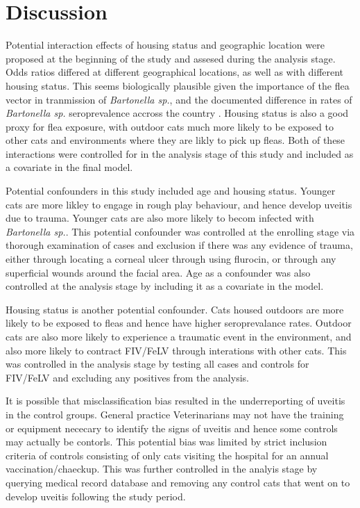 \documentclass[11pt,twocolumn]{article}
\begin{document}
\section{Discussion}
		Potential interaction effects of housing status and geographic location were proposed at the beginning of the study and assesed during the analysis stage.
		Odds ratios differed at different geographical locations, as well as with different housing status.
		This seems biologically plausible given the importance of the flea vector in tranmission of \emph{Bartonella sp.}, and the documented difference in rates of \emph{Bartonella sp.} seroprevalence accross the country \cite{Jameson1995a}.
		Housing status is also a good proxy for flea exposure, with outdoor cats much more likely to be exposed to other cats and environments where they are likly to pick up fleas.
		Both of these interactions were controlled for in the analysis stage of this study and included as a covariate in the final model.

		Potential confounders in this study included age and housing status. 
		Younger cats are more likley to engage in rough play behaviour, and hence develop uveitis due to trauma. Younger cats are also more likely to becom infected with \emph{Bartonella sp.}.
		This potential confounder was controlled at the enrolling stage via thorough examination of cases and exclusion if there was any evidence of trauma, either through locating a corneal ulcer through using flurocin, or through any superficial wounds around the facial area.
		Age as a confounder was also controlled at the analysis stage by including it as a covariate in the model.

		
		Housing status is another potential confounder. Cats housed outdoors are more likely to be exposed to fleas and hence have higher seroprevalance rates.
		Outdoor cats are also more likely to experience a traumatic event in the environment, and also more likely to contract FIV/FeLV through interations with other cats.
		This was controlled in the analysis stage by testing all cases and controls for FIV/FeLV and excluding any positives from the analysis.


		It is possible that misclassification bias resulted in the underreporting of uveitis in the control groups. General practice Veterinarians may not have the training or equipment nececary to identify the signs of uveitis and hence some controls may actually be contorls.
		This potential bias was limited by strict inclusion criteria of controls consisting of only cats visiting the hospital for an annual vaccination/chaeckup. 
		This was further controlled in the analyis stage by querying medical record database and removing any control cats that went on to develop uveitis following the study period.
\end{document}
